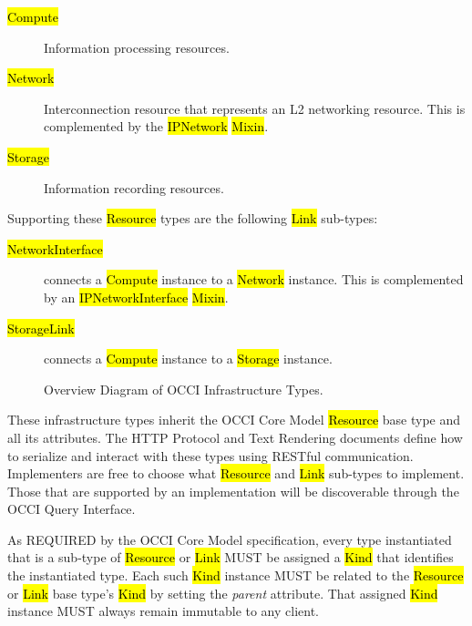 \documentclass[10pt,a4paper]{article}
\begin{document}
\begin{description}
\item[\hl{Compute}] Information processing resources.
\item[\hl{Network}] Interconnection resource that represents an L2
  networking resource. This is complemented by the \hl{IPNetwork}
  \hl{Mixin}.
\item[\hl{Storage}] Information recording resources.
\end{description}

Supporting these \hl{Resource} types are the following \hl{Link} sub-types:

\begin{description}
\item[\hl{NetworkInterface}] connects a \hl{Compute} instance to a
  \hl{Network} instance. This is complemented by an
  \hl{IPNetworkInterface} \hl{Mixin}.
\item[\hl{StorageLink}] connects a \hl{Compute} instance to a
  \hl{Storage} instance.
\end{description}

\begin{figure}[!h]
	{\centering {} \par}
	\caption{Overview Diagram of OCCI Infrastructure Types.}
	\label{fig:infra_uml}
\end{figure}

These infrastructure types inherit the OCCI Core Model \hl{Resource}
base type and all its attributes. The HTTP Protocol \cite{occi:http_protocol} and Text
Rendering \cite{occi:text_rendering} documents define how to serialize and interact with
these types using RESTful communication. Implementers are free to
choose what \hl{Resource} and \hl{Link} sub-types to implement. Those
that are supported by an implementation will be discoverable through
the OCCI Query Interface.

As REQUIRED by the OCCI Core Model specification, every type
instantiated that is a sub-type of \hl{Resource} or \hl{Link} MUST be
assigned a \hl{Kind} that identifies the instantiated type. Each such
\hl{Kind} instance MUST be related to the \hl{Resource} or \hl{Link}
base type's \hl{Kind} by setting the \textit{parent} attribute.
 That assigned \hl{Kind} instance MUST always
remain immutable to any client.
\end{document}
